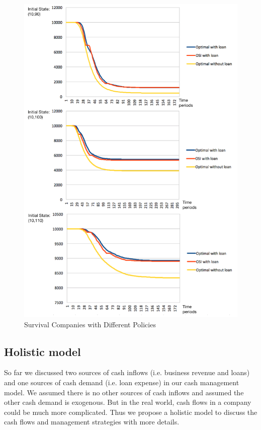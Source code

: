 \documentclass[12pt]{article}
\begin{document}
\begin{figure}
\begin{center}
\includegraphics[scale=.6]{OSI}
\end{center}
\caption{Survival Companies with Different Policies}
\label{OSI}
\end{figure}












\subsection{Holistic model}
So far we discussed two sources of cash inflows (i.e. business revenue and loans) and one sources of cash demand (i.e. loan expense) in our cash management model. We assumed there is no other sources of cash inflows and assumed the other cash demand is exogenous. But in the real world, cash flows in a company could be much more complicated. Thus we propose a holistic model to discuss the cash flows and management strategies with more details.
\end{document}
